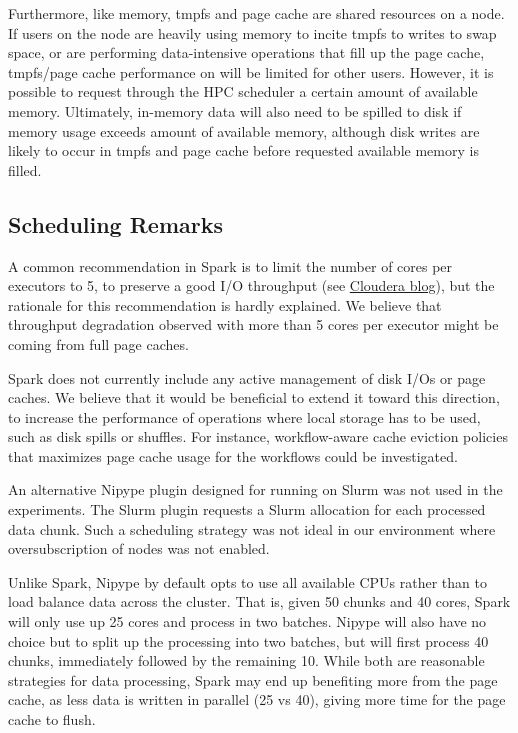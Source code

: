 Furthermore, like memory, tmpfs and page cache are shared resources on a node.
If users on the node are heavily using memory to incite tmpfs to writes to swap
space, or are performing data-intensive operations that fill up the page cache,
tmpfs/page cache performance on will be limited for other users. However, it is
possible to request through the HPC scheduler a certain amount of available
memory. Ultimately, in-memory data will also need to be spilled to disk if
memory usage exceeds amount of available memory, although disk writes are likely
to occur in tmpfs and page cache before requested available memory is filled.

\subsection{Scheduling Remarks}

A common recommendation in Spark is to limit the number of cores per executors
to 5, to preserve a good I/O throughput (see
\href{http://blog.cloudera.com/blog/2015/03/how-to-tune-your-apache-spark-jobs-part-2}{Cloudera
blog}), but the rationale for this recommendation is hardly explained. We
believe that throughput degradation observed with more than 5 cores per executor
might be coming from full page caches.

Spark does not currently include any active management of disk I/Os or page
caches. We believe that it would be beneficial to extend it toward this
direction, to increase the performance of operations where local storage has to
be used, such as disk spills or shuffles. For instance, workflow-aware cache
eviction policies that maximizes page cache usage for the workflows could be
investigated. 

An alternative Nipype plugin designed for running on Slurm was not used in the
experiments. The Slurm plugin requests a Slurm allocation for each processed
data chunk. Such a scheduling strategy was not ideal in our environment where
oversubscription of nodes was not enabled.

Unlike Spark, Nipype by default opts to use all available CPUs rather than to
load balance data across the cluster. That is, given 50 chunks and 40 cores,
Spark will only use up 25 cores and process in two batches. Nipype will also
have no choice but to split up the processing into two batches, but will first
process 40 chunks, immediately followed by the remaining 10. While both are
reasonable strategies for data processing, Spark may end up benefiting more from
the page cache, as less data is written in parallel (25 vs 40), giving more time
for the page cache to flush.


